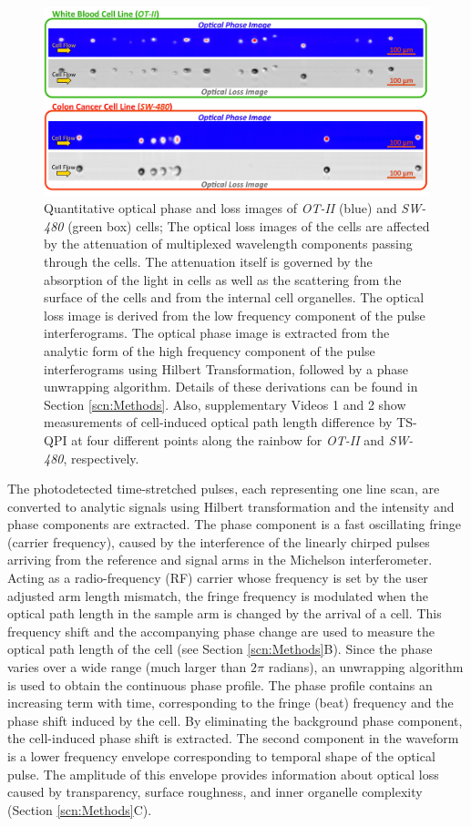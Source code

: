 \documentclass[aps,pra,reprint,longbibliography,superscriptaddress]{revtex4-1}
\begin{document}
\begin{figure}
\includegraphics[scale=0.2]{Figure2DImage.jpg}
\caption{\label{fig:2DImage} Quantitative optical phase and loss images of \textit{OT-II} (blue) and \textit{SW-480} (green box) cells; The optical loss images of the cells are affected by the attenuation of multiplexed wavelength components passing through the cells. The attenuation itself is governed by the absorption of the light in cells as well as the scattering from the surface of the cells and from the internal cell organelles. The optical loss image is derived from the low frequency component of the pulse interferograms. The optical phase image is extracted from the analytic form of the high frequency component of the pulse interferograms using Hilbert Transformation, followed by a phase unwrapping algorithm. Details of these derivations can be found in Section \ref{scn:Methods}. Also, supplementary Videos 1 and 2 show measurements of cell-induced optical path length difference by TS-QPI at four different points along the rainbow for \textit{OT-II} and \textit{SW-480}, respectively.}
\end{figure}

The photodetected time-stretched pulses, each representing one line scan, are converted to analytic signals using Hilbert transformation \cite{king2009hilbert} and the intensity and phase components are extracted. The phase component is a fast oscillating fringe (carrier frequency), caused by the interference of the linearly chirped pulses arriving from the reference and signal arms in the Michelson interferometer. Acting as a radio-frequency (RF) carrier whose frequency is set by the user adjusted arm length mismatch, the fringe frequency is modulated when the optical path length in the sample arm is changed by the arrival of a cell. This frequency shift and the accompanying phase change are used to measure the optical path length of the cell (see Section \ref{scn:Methods}B). Since the phase varies over a wide range (much larger than $2 \pi$ radians), an unwrapping algorithm is used to obtain the continuous phase profile. The phase profile contains an increasing term with time, corresponding to the fringe (beat) frequency and the phase shift induced by the cell. By eliminating the background phase component, the cell-induced phase shift is extracted. The second component in the waveform is a lower frequency envelope corresponding to temporal shape of the optical pulse. The amplitude of this envelope provides information about optical loss caused by transparency, surface roughness, and inner organelle complexity (Section \ref{scn:Methods}C). 
\end{document}
